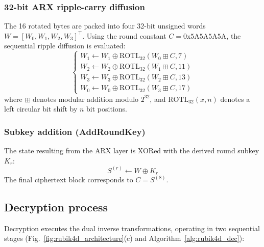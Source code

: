 \documentclass[10pt,twocolumn]{article}
\begin{document}
\subsubsection{32-bit ARX ripple-carry diffusion}
The 16 rotated bytes are packed into four 32-bit unsigned words $W = [W_0, W_1, W_2, W_3]^\top$. Using the round constant $C = \text{0x5A5A5A5A}$, the sequential ripple diffusion is evaluated:
\begin{equation}
\begin{cases}
    W_1 \leftarrow W_1 \oplus \text{ROTL}_{32}(W_0 \boxplus C, 7) \\
    W_2 \leftarrow W_2 \oplus \text{ROTL}_{32}(W_1 \boxplus C, 11) \\
    W_3 \leftarrow W_3 \oplus \text{ROTL}_{32}(W_2 \boxplus C, 13) \\
    W_0 \leftarrow W_0 \oplus \text{ROTL}_{32}(W_3 \boxplus C, 17)
\end{cases}
\end{equation}
where $\boxplus$ denotes modular addition modulo $2^{32}$, and $\text{ROTL}_{32}(x, n)$ denotes a left circular bit shift by $n$ bit positions.

\subsubsection{Subkey addition (AddRoundKey)}
The state resulting from the ARX layer is XORed with the derived round subkey $K_r$:
\begin{equation}
    S^{(r)} \leftarrow W \oplus K_r
\end{equation}
The final ciphertext block corresponds to $C = S^{(8)}$.

\subsection{Decryption process}
Decryption executes the dual inverse transformations, operating in two sequential stages (Fig.~\ref{fig:rubik4d_architecture}(c) and Algorithm~\ref{alg:rubik4d_dec}):
\end{document}
